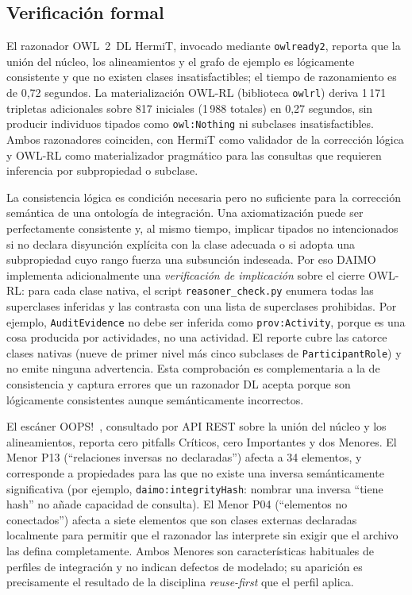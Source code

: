\documentclass[Afour,sagev,times]{sagej}
\newcommand{\code}[1]{\texttt{#1}}
\begin{document}
\subsection{Verificación formal}\label{sec:eval-engineering}

El razonador OWL~2~DL HermiT, invocado mediante \code{owlready2}, reporta que la unión del núcleo, los alineamientos y el grafo de ejemplo es lógicamente consistente y que no existen clases insatisfactibles; el tiempo de razonamiento es de 0,72 segundos. La materialización OWL-RL (biblioteca \code{owlrl}) deriva 1\,171 tripletas adicionales sobre 817 iniciales (1\,988 totales) en 0,27 segundos, sin producir individuos tipados como \code{owl:Nothing} ni subclases insatisfactibles. Ambos razonadores coinciden, con HermiT como validador de la corrección lógica y OWL-RL como materializador pragmático para las consultas que requieren inferencia por subpropiedad o subclase.

La consistencia lógica es condición necesaria pero no suficiente para la corrección semántica de una ontología de integración. Una axiomatización puede ser perfectamente consistente y, al mismo tiempo, implicar tipados no intencionados si no declara disyunción explícita con la clase adecuada o si adopta una subpropiedad cuyo rango fuerza una subsunción indeseada. Por eso DAIMO implementa adicionalmente una \emph{verificación de implicación} sobre el cierre OWL-RL: para cada clase nativa, el script \code{reasoner\_check.py} enumera todas las superclases inferidas y las contrasta con una lista de superclases prohibidas. Por ejemplo, \code{AuditEvidence} no debe ser inferida como \code{prov:Activity}, porque es una cosa producida por actividades, no una actividad. El reporte cubre las catorce clases nativas (nueve de primer nivel más cinco subclases de \code{ParticipantRole}) y no emite ninguna advertencia. Esta comprobación es complementaria a la de consistencia y captura errores que un razonador DL acepta porque son lógicamente consistentes aunque semánticamente incorrectos.

El escáner OOPS!~\cite{oops14}, consultado por API REST sobre la unión del núcleo y los alineamientos, reporta cero pitfalls Críticos, cero Importantes y dos Menores. El Menor P13 (``relaciones inversas no declaradas'') afecta a 34 elementos, y corresponde a propiedades para las que no existe una inversa semánticamente significativa (por ejemplo, \code{daimo:integrityHash}: nombrar una inversa ``tiene hash'' no añade capacidad de consulta). El Menor P04 (``elementos no conectados'') afecta a siete elementos que son clases externas declaradas localmente para permitir que el razonador las interprete sin exigir que el archivo las defina completamente. Ambos Menores son características habituales de perfiles de integración y no indican defectos de modelado; su aparición es precisamente el resultado de la disciplina \emph{reuse-first} que el perfil aplica.
\end{document}
